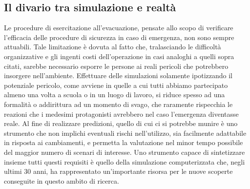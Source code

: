 \subsection{Il divario tra simulazione e realtà}
Le procedure di esercitazione all'evacuazione, pensate allo scopo di verificare l'efficacia delle procedure di sicurezza in caso di emergenza, non sono sempre attuabili. Tale limitazione è dovuta al fatto che, tralasciando le difficoltà organizzative e gli ingenti costi dell'operazione in casi analoghi a quelli sopra citati, sarebbe necessario esporre le persone ai reali pericoli che potrebbero insorgere nell'ambiente. \newline 
Effettuare delle simulazioni solamente ipotizzando il potenziale pericolo, come avviene in quelle a cui tutti abbiamo partecipato almeno una volta a scuola o in un luogo di lavoro, si riduce spesso ad una formalità o addirittura ad un momento di svago, che raramente rispecchia le reazioni che i medesimi protagonisti avrebbero nel caso l'emergenza diventasse reale. \newline
Al fine di realizzare predizioni, quello di cui ci si potrebbe munire è uno strumento che non implichi eventuali rischi nell'utilizzo, sia facilmente adattabile in risposta ai cambiamenti, e permetta la valutazione nel minor tempo possibile del maggior numero di scenari di interesse. \newline
Uno strumento capace di sintetizzare insieme tutti questi requisiti è quello della simulazione computerizzata che, negli ultimi 30 anni, ha rappresentato un'importante risorsa per le nuove scoperte conseguite in questo ambito di ricerca.